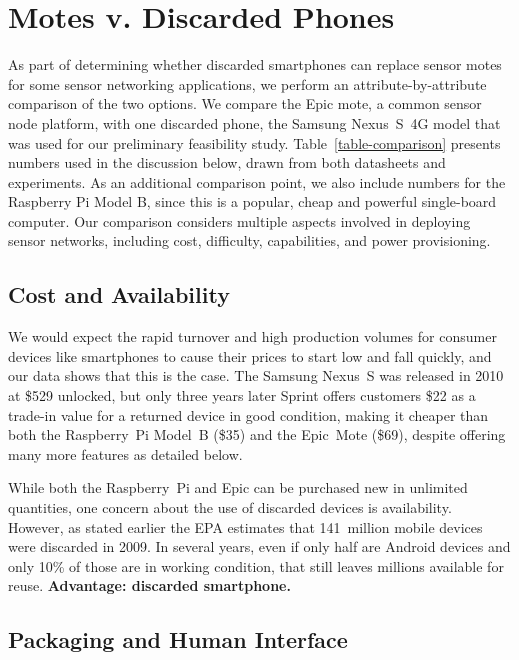 \section{Motes v. Discarded Phones}
\label{sec-comparison}



As part of determining whether discarded smartphones can replace sensor motes
for some sensor networking applications, we perform an attribute-by-attribute
comparison of the two options. We compare the Epic mote, a common sensor node
platform, with one discarded phone, the Samsung Nexus~S~4G  model that was
used for our preliminary feasibility study. Table~\ref{table-comparison}
presents numbers used in the discussion below, drawn from both datasheets and
experiments. As an additional comparison point, we also include numbers for
the Raspberry Pi Model B, since this is a popular, cheap and powerful
single-board computer. Our comparison considers multiple aspects involved
in deploying sensor networks, including cost, difficulty, capabilities, and 
power provisioning.

\subsection{Cost and Availability}

We would expect the rapid turnover and high production volumes for consumer
devices like smartphones to cause their prices to start low and fall quickly,
and our data shows that this is the case. The Samsung Nexus~S was released in
2010 at \$529 unlocked, but only three years later Sprint offers customers
\$22 as a trade-in value for a returned device in good condition, making it
cheaper than both the Raspberry~Pi Model~B (\$35) and the Epic~Mote (\$69),
despite offering many more features as detailed below.

While both the Raspberry~Pi and Epic can be purchased new in unlimited
quantities, one concern about the use of discarded devices is availability.
However, as stated earlier the EPA estimates that 141~million mobile devices
were discarded in 2009. In several years, even if only half are Android
devices and only 10\% of those are in working condition, that still leaves
millions available for reuse. \textbf{Advantage: discarded smartphone.}

\subsection{Packaging and Human Interface}

